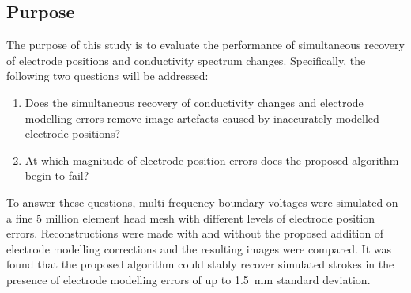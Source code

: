 \subsection{Purpose}
The purpose of this study is to evaluate the performance of simultaneous recovery of electrode positions and conductivity spectrum changes. Specifically, the following two questions will be addressed:
\begin{enumerate}
\item Does the simultaneous recovery of conductivity changes and electrode modelling errors remove image artefacts caused by inaccurately modelled electrode positions?
\item At which magnitude of electrode position errors does the proposed algorithm begin to fail?
\end{enumerate}
To answer these questions, multi-frequency boundary voltages were simulated on a fine 5 million element head mesh with different levels of electrode position errors. Reconstructions were made with and without the proposed addition of electrode modelling corrections and the resulting images were compared. It was found that the proposed algorithm could stably recover simulated strokes in the presence of electrode modelling errors of up to \SI{1.5}{\milli\metre} standard deviation.